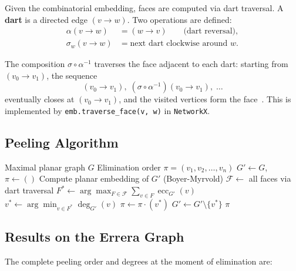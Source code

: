 \documentclass[12pt,letterpaper]{article}
\theoremstyle{plain}
\theoremstyle{definition}
\theoremstyle{remark}
\newcommand{\degr}{\operatorname{deg}}
\newcommand{\ecc}{\operatorname{ecc}}
\begin{document}
Given the combinatorial embedding, faces are computed via dart traversal. A
\textbf{dart} is a directed edge $(v \to w)$. Two operations are defined:
\begin{align}
    \alpha(v \to w) &= (w \to v) \qquad \text{(dart reversal)}, \\
    \sigma_w(v \to w) &= \text{next dart clockwise around } w.
\end{align}

The composition $\sigma \circ \alpha^{-1}$ traverses the face adjacent to each
dart: starting from $(v_0 \to v_1)$, the sequence
\[
(v_0 \to v_1),\; (\sigma \circ \alpha^{-1})(v_0 \to v_1),\; \ldots
\]
eventually closes at $(v_0 \to v_1)$, and the visited vertices form the
face~\cite{mohar2001}. This is implemented by \texttt{emb.traverse\_face(v, w)}
in \texttt{NetworkX}.

\subsection{Peeling Algorithm}

\begin{algorithm}[H]
\caption{Topological peeling}
\label{alg:peeling}
\begin{algorithmic}[1]
\Require Maximal planar graph $G$
\Ensure Elimination order $\pi = (v_1, v_2, \ldots, v_n)$
\State $G' \gets G$, $\pi \gets ()$
    \State Compute planar embedding of $G'$ (Boyer-Myrvold)
    \State $\mathcal{F} \gets$ all faces via dart traversal
    \State $F^* \gets \arg\max_{F \in \mathcal{F}} \sum_{v \in F} \ecc_{G'}(v)$
    \State $v^* \gets \arg\min_{v \in F^*} \degr_{G'}(v)$
    \State $\pi \gets \pi \cdot (v^*)$
    \State $G' \gets G' \setminus \{v^*\}$
\EndWhile
\State \Return $\pi$
\end{algorithmic}
\end{algorithm}

\subsection{Results on the Errera Graph}

The complete peeling order and degrees at the moment of elimination are:
\end{document}
